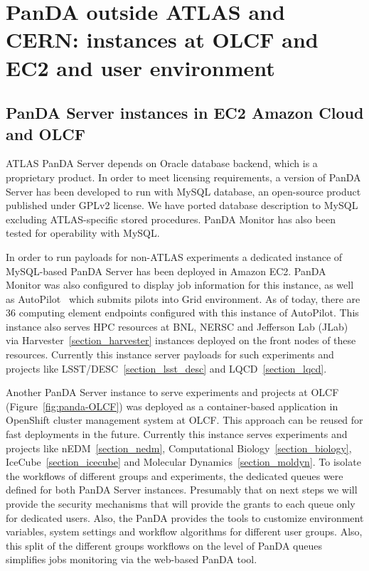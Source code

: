 \documentclass{webofc}
\begin{document}
\section{PanDA outside ATLAS and CERN: instances at OLCF and EC2 and user environment}

\subsection{PanDA Server instances in EC2 Amazon Cloud and OLCF}


ATLAS PanDA Server depends on Oracle database backend, which is a proprietary product. In order to meet licensing requirements, a version of PanDA Server has been developed to run with MySQL database, an open-source product published under GPLv2 license.  We have ported database description to MySQL excluding ATLAS-specific stored procedures. PanDA Monitor has also been tested for operability with MySQL.

In order to run payloads for non-ATLAS experiments a dedicated instance of MySQL-based PanDA Server has been deployed in Amazon EC2.  PanDA Monitor was also configured to display job information for this instance, as well as AutoPilot~\cite{PanDAPilotSubmission} which submits pilots into Grid environment. As of today, there are 36 computing element endpoints configured with this instance of AutoPilot. This instance also serves HPC resources at BNL, NERSC and Jefferson Lab (JLab) via Harvester~\ref{section_harvester} instances deployed on the front nodes of these resources. Currently this instance server payloads for such experiments and projects like LSST/DESC~\ref{section_lsst_desc} and LQCD~\ref{section_lqcd}.

Another  PanDA Server instance to serve experiments and projects at OLCF (Figure~\ref{fig:panda-OLCF}) was deployed as a container-based application in OpenShift cluster management system at OLCF. This approach can be reused for fast deployments in the future. Currently this instance serves experiments and projects like nEDM~\ref{section_nedm}, Computational Biology~\ref{section_biology}, IceCube~\ref{section_icecube} and Molecular Dynamics~\ref{section_moldyn}.
To isolate the workflows of different groups and experiments, the dedicated queues were defined for both PanDA Server instances. Presumably that on next steps we will provide the security mechanisms that will provide the grants to each queue only for dedicated users. Also, the PanDA provides the tools to customize environment variables, system settings and workflow algorithms for different user groups. Also, this split of the different groups workflows on the level of PanDA queues simplifies jobs monitoring via the web-based PanDA tool. 
\end{document}
